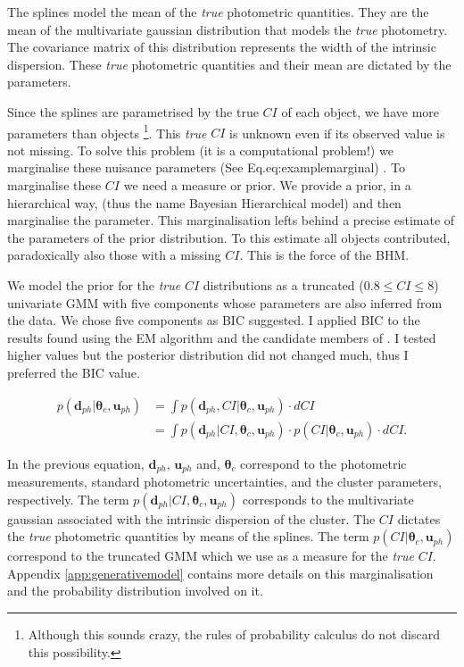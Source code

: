 The splines model the mean of the \emph{true} photometric quantities. They are the mean of the multivariate gaussian distribution that models the \emph{true} photometry. The covariance matrix of this distribution represents the width of the intrinsic dispersion. These \emph{true} photometric quantities and their mean are dictated by the parameters. 

Since the splines are parametrised by the true $CI$ of each object, we have more parameters than objects \footnote{Although this sounds crazy, the rules of probability calculus do not discard this possibility.}. This \emph{true} $CI$ is unknown even if its observed value is not missing. To solve this problem (it is a computational problem!) we marginalise these nuisance parameters (See Eq.eq:examplemarginal) . To marginalise these $CI$ we need a measure or prior. We provide a prior, in a hierarchical way, (thus the name Bayesian Hierarchical model) and then marginalise the parameter. This marginalisation lefts behind a precise estimate of the parameters of the prior distribution. To this estimate all objects contributed, paradoxically also those with a missing $CI$. This is the force of the BHM.

We model the prior for the \emph{true} $CI$ distributions as a truncated ($0.8\leq CI \leq8$) univariate GMM with five components whose parameters are also inferred from the data. We chose five components as BIC suggested. I applied BIC to the results found using the EM algorithm and the candidate members of \citet{Bouy2015}. I tested higher values but the posterior distribution did not changed much, thus I preferred the BIC value.

\begin{align}
 p(\mathbf{d}_{ph}| \boldsymbol{\theta}_c,\mathbf{u}_{ph})&=\int p(\mathbf{d}_{ph},CI| \boldsymbol{\theta}_c,\mathbf{u}_{ph})\cdot dCI \nonumber \\ 
 &=\int p(\mathbf{d}_{ph}|CI, \boldsymbol{\theta}_c,\mathbf{u}_{ph})\cdot p(CI| \boldsymbol{\theta}_c,\mathbf{u}_{ph})\cdot dCI .
 \label{eq:examplemarginal}
\end{align}

In the previous equation, $\mathbf{d}_{ph}$, $\mathbf{u}_{ph}$ and, $\boldsymbol{\theta}_c$ correspond to the photometric measurements,   standard photometric uncertainties, and the cluster parameters, respectively. The term $p(\mathbf{d}_{ph}|CI, \boldsymbol{\theta}_c,\mathbf{u}_{ph})$ corresponds to the multivariate gaussian associated with the intrinsic dispersion of the cluster. The $CI$ dictates the \emph{true} photometric quantities by means of the splines. The term $p(CI| \boldsymbol{\theta}_c,\mathbf{u}_{ph})$ correspond to the truncated GMM which we use as a measure for the \emph{true} $CI$. Appendix \ref{app:generativemodel} contains more details on this marginalisation and the probability distribution involved on it.

